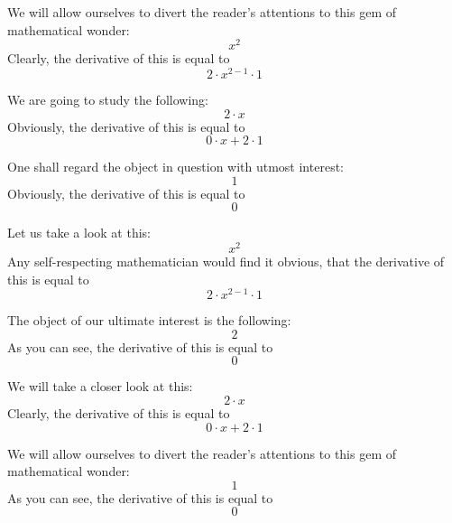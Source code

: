 \documentclass{article}
\begin{document}
We will allow ourselves to divert the reader's attentions to this gem of mathematical wonder:
\begin{equation}
x ^{2 } 
\end{equation}
Clearly, the derivative of this is equal to
\begin{equation}
2 \cdot x ^{2 - 1 } \cdot 1 
\end{equation}

We are going to study the following:
\begin{equation}
2 \cdot x 
\end{equation}
Obviously, the derivative of this is equal to
\begin{equation}
0 \cdot x + 2 \cdot 1 
\end{equation}

One shall regard the object in question with utmost interest:
\begin{equation}
1 
\end{equation}
Obviously, the derivative of this is equal to
\begin{equation}
0 
\end{equation}

Let us take a look at this:
\begin{equation}
x ^{2 } 
\end{equation}
Any self-respecting mathematician would find it obvious, that the derivative of this is equal to
\begin{equation}
2 \cdot x ^{2 - 1 } \cdot 1 
\end{equation}

The object of our ultimate interest is the following:
\begin{equation}
2 
\end{equation}
As you can see, the derivative of this is equal to
\begin{equation}
0 
\end{equation}

We will take a closer look at this:
\begin{equation}
2 \cdot x 
\end{equation}
Clearly, the derivative of this is equal to
\begin{equation}
0 \cdot x + 2 \cdot 1 
\end{equation}

We will allow ourselves to divert the reader's attentions to this gem of mathematical wonder:
\begin{equation}
1 
\end{equation}
As you can see, the derivative of this is equal to
\begin{equation}
0 
\end{equation}
\end{document}
